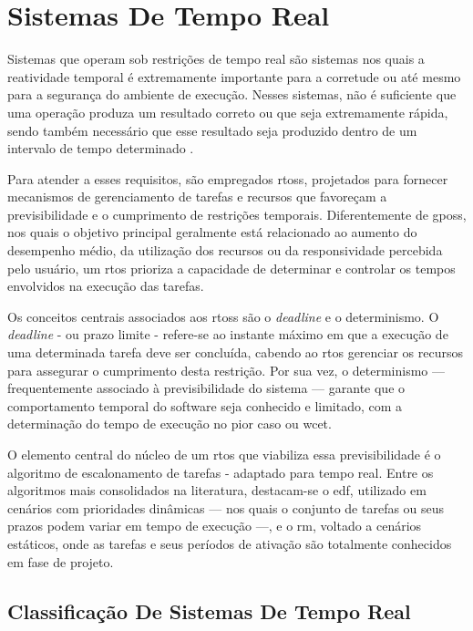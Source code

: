 \section{Sistemas De Tempo Real}

Sistemas que operam sob restrições de tempo real são sistemas nos quais a reatividade temporal é extremamente importante para a corretude ou até mesmo para a
segurança do ambiente de execução. Nesses sistemas, não é suficiente que uma operação produza um resultado correto ou que seja extremamente rápida, sendo também necessário que esse resultado
seja produzido dentro de um intervalo de tempo determinado \cite{stankovic1988misconceptions}. 

Para atender a esses requisitos, são empregados \glspl{rtos}, projetados para fornecer mecanismos de gerenciamento de tarefas e recursos que favoreçam a previsibilidade e o cumprimento de
restrições temporais. Diferentemente de \glspl{gpos}, nos quais o objetivo principal geralmente está relacionado ao aumento do desempenho médio, da utilização dos
recursos ou da responsividade percebida pelo usuário, um \gls{rtos} prioriza a capacidade de determinar e controlar os tempos envolvidos na execução das tarefas.

Os conceitos centrais associados aos \glspl{rtos} são o \textit{deadline} e o determinismo. O \textit{deadline} - ou prazo limite - refere-se ao instante máximo em que a execução de uma
determinada tarefa deve ser concluída, cabendo ao \gls{rtos} gerenciar os recursos para assegurar o cumprimento desta restrição. Por sua vez, o determinismo — frequentemente associado
à previsibilidade do sistema — garante que o comportamento temporal do software seja conhecido e limitado, com a determinação do tempo de execução no pior caso ou \gls{wcet}.

O elemento central do núcleo de um \gls{rtos} que viabiliza essa previsibilidade é o algoritmo de escalonamento de tarefas  - adaptado para tempo real.
Entre os algoritmos mais consolidados na literatura, destacam-se o \gls{edf}, utilizado em cenários com prioridades dinâmicas — nos quais o conjunto de tarefas ou seus prazos podem
variar em tempo de execução —, e o \gls{rm}, voltado a cenários estáticos, onde as tarefas e seus períodos de ativação são totalmente conhecidos em fase de projeto.

\subsection{Classificação De Sistemas De Tempo Real}

